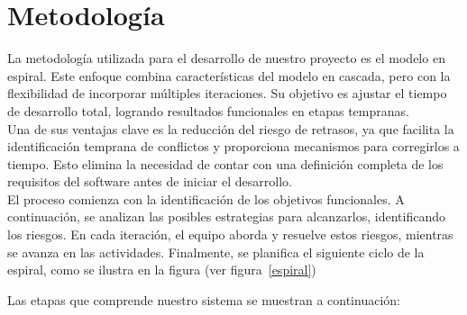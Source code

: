 \section{Metodología}
\label{cap:Meto}

	La metodología utilizada para el desarrollo de nuestro proyecto es el modelo en espiral. Este enfoque combina características del modelo en cascada, pero con la flexibilidad de incorporar múltiples iteraciones. Su objetivo es ajustar el tiempo de desarrollo total, logrando resultados funcionales en etapas tempranas. \\ 
	
	Una de sus ventajas clave es la reducción del riesgo de retrasos, ya que facilita la identificación temprana de conflictos y proporciona mecanismos para corregirlos a tiempo. Esto elimina la necesidad de contar con una definición completa de los requisitos del software antes de iniciar el desarrollo. \\
	
	El proceso comienza con la identificación de los objetivos funcionales. A continuación, se analizan las posibles estrategias para alcanzarlos, identificando los riesgos. En cada iteración, el equipo aborda y resuelve estos riesgos, mientras se avanza en las actividades. Finalmente, se planifica el siguiente ciclo de la espiral, como se ilustra en la figura (ver figura~\ref{espiral})


	Las etapas que comprende nuestro sistema se muestran a continuación:
	
